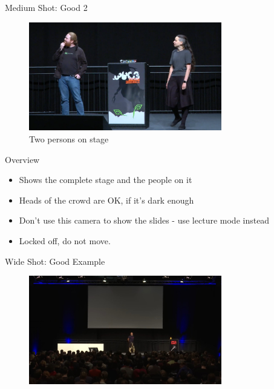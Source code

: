 \begin{frame}{Medium Shot: Good 2}
	\begin{figure}
		\centering
		\includegraphics[width=0.75\textwidth]{images/shot-medium2.png}
		\caption{Two persons on stage}
	\end{figure}
\end{frame}

\begin{frame}{Overview}
	\begin{itemize}
		\item Shows the complete stage and the people on it
		\item Heads of the crowd are OK, if it's dark enough
		\item Don't use this camera to show the slides - use lecture mode instead
		\item Locked off, do not move.
	\end{itemize}
\end{frame}

\begin{frame}{Wide Shot: Good Example}
	\begin{figure}
		\centering
		\includegraphics[width=0.75\textwidth]{images/shot-wide.jpeg}
	\end{figure}
\end{frame}
